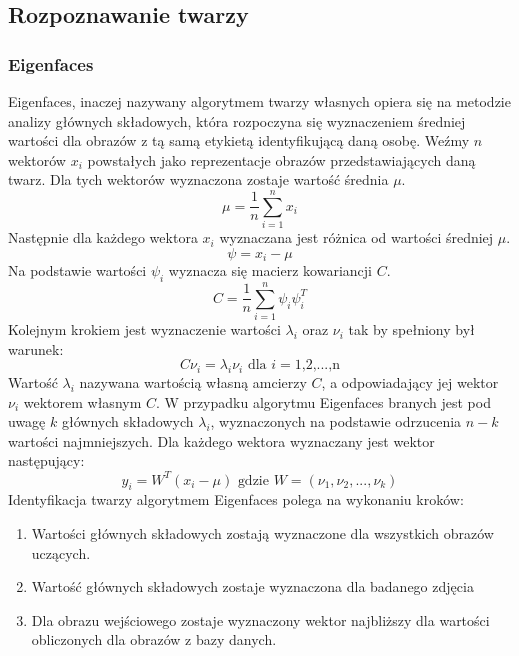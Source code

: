 \subsection{Rozpoznawanie twarzy}
\subsubsection{Eigenfaces} \label{eigen}
Eigenfaces, inaczej nazywany algorytmem twarzy własnych opiera się na metodzie analizy głównych składowych, która rozpoczyna się wyznaczeniem średniej wartości dla obrazów z tą samą etykietą identyfikującą daną osobę.
Weźmy $n$ wektorów $x_{i}$ powstałych jako reprezentacje obrazów przedstawiających daną twarz. Dla tych wektorów wyznaczona zostaje wartość średnia $\mu$.
$$
\mu=\frac{1}{n}\sum_{i=1}^{n}x_{i}
$$
Następnie dla każdego wektora $x_{i}$ wyznaczana jest różnica od wartości średniej $\mu$.
$$
\psi= x_{i}-\mu
$$
Na podstawie wartości $\psi_{i}$ wyznacza się macierz kowariancji $C$.
$$
C=\frac{1}{n}\sum_{i=1}^{n}\psi_{i}\psi_{i}^{T}
$$
Kolejnym krokiem jest wyznaczenie wartości $\lambda_{i}$ oraz $\nu_{i}$ tak by spełniony był warunek:
$$
C\nu_{i}=\lambda_{i}\nu_{i} \textrm{ dla $i=$1,2,...,n}
$$
Wartość $\lambda_{i}$ nazywana wartością własną amcierzy $C$, a odpowiadający jej wektor $\nu_{i}$ wektorem własnym $C$.
W przypadku algorytmu Eigenfaces branych jest pod uwagę $k$ głównych składowych $\lambda_{i}$, wyznaczonych na podstawie odrzucenia $n-k$ wartości najmniejszych. Dla każdego wektora wyznaczany jest wektor następujący:
$$
y_{i}=W^{T}(x_{i}-\mu) \textrm{ gdzie $W=(\nu_{1}, \nu_{2}, ..., \nu_{k})$}
$$
Identyfikacja twarzy algorytmem Eigenfaces polega na wykonaniu kroków:
\begin{enumerate}
\item Wartości głównych składowych zostają wyznaczone dla wszystkich obrazów uczących.
\item Wartość głównych składowych zostaje wyznaczona dla badanego zdjęcia
\item Dla obrazu wejściowego zostaje wyznaczony wektor najbliższy dla wartości obliczonych dla obrazów z bazy danych.
\end{enumerate}

